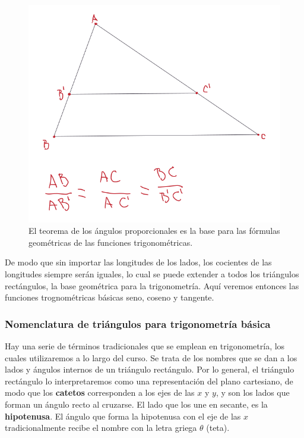 \documentclass[
]{book}
\begin{document}
\begin{figure}

{\centering \includegraphics[width=8.97in]{Unidad-II/Trian-prop} 

}

\caption{El teorema de los ángulos proporcionales es la base para las fórmulas geométricas de las funciones trigonométricas.}\label{fig:trian-prop}
\end{figure}

De modo que sin importar las longitudes de los lados, los cocientes de las longitudes siempre serán iguales, lo cual se puede extender a todos los triángulos rectángulos, la base geométrica para la trigonometría. Aquí veremos entonces las funciones trognométricas básicas seno, coseno y tangente.

\hypertarget{nomenclatura-de-triuxe1ngulos-para-trigonometruxeda-buxe1sica}{%
\subsubsection{Nomenclatura de triángulos para trigonometría básica}\label{nomenclatura-de-triuxe1ngulos-para-trigonometruxeda-buxe1sica}}

Hay una serie de términos tradicionales que se emplean en trigonometría, los cuales utilizaremos a lo largo del curso. Se trata de los nombres que se dan a los lados y ángulos internos de un triángulo rectángulo. Por lo general, el triángulo rectángulo lo interpretaremos como una representación del plano cartesiano, de modo que los \textbf{catetos} corresponden a los ejes de las \(x\) y \(y\), y son los lados que forman un ángulo recto al cruzarse. El lado que los une en secante, es la \textbf{hipotenusa}. El ángulo que forma la hipotenusa con el eje de las \(x\) tradicionalmente recibe el nombre con la letra griega \(\theta\) (teta).
\end{document}
